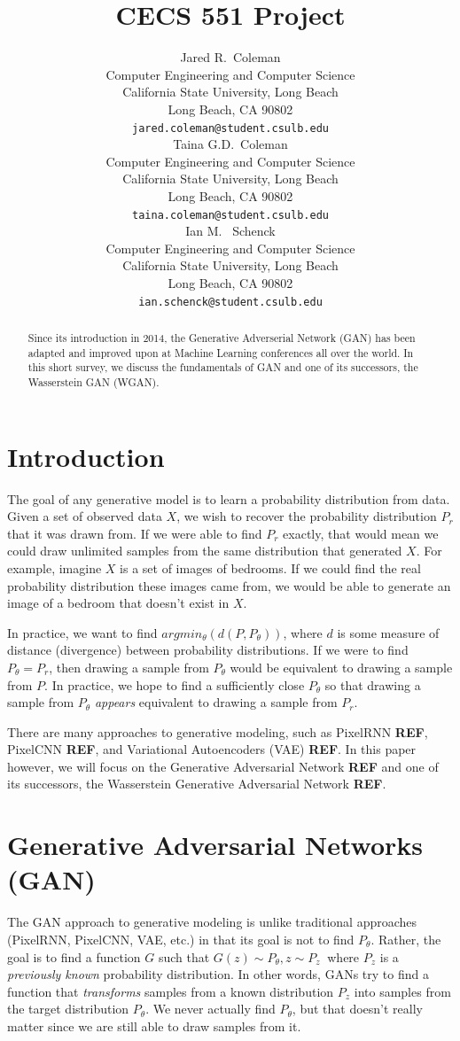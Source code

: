 \documentclass{article}
\title{CECS 551 Project}
\author{%
  Jared R.~Coleman\\
  Computer Engineering and Computer Science\\
  California State University, Long Beach\\
  Long Beach, CA 90802 \\
  \texttt{jared.coleman@student.csulb.edu} \\
  \And 
  Taina G.D.~Coleman\\
  Computer Engineering and Computer Science\\
  California State University, Long Beach\\
  Long Beach, CA 90802 \\
  \texttt{taina.coleman@student.csulb.edu} \\
  \And 
  Ian M. ~Schenck\\
  Computer Engineering and Computer Science\\
  California State University, Long Beach\\
  Long Beach, CA 90802 \\
  \texttt{ian.schenck@student.csulb.edu} \\
}
\begin{document}
\maketitle

\begin{abstract}
   Since its introduction in 2014, the Generative Adverserial Network (GAN) has been adapted and improved upon at Machine Learning conferences all over the world. In this short survey, we discuss the fundamentals of GAN and one of its successors, the Wasserstein GAN (WGAN).
\end{abstract}


\section{Introduction} 
The goal of any generative model is to learn a probability distribution from data. Given a set of observed data $X$, we wish to recover the probability distribution $P_r$ that it was drawn from. If we were able to find $P_r$ exactly, that would mean we could draw unlimited samples from the same distribution that generated $X$. For example, imagine $X$ is a set of images of bedrooms. If we could find the real probability distribution these images came from, we would be able to generate an image of a bedroom that doesn't exist in $X$. 


In practice, we want to find $argmin_\theta(d(P, P_\theta))$, where $d$ is some measure of distance (divergence) between probability distributions. If we were to find $P_\theta=P_r$, then drawing a sample from $P_\theta$ would be equivalent to drawing a sample from $P$. In practice, we hope to find a sufficiently close $P_\theta$ so that drawing a sample from $P_\theta$ \textit{appears} equivalent to drawing a sample from $P_r$.

There are many approaches to generative modeling, such as PixelRNN \textbf{REF}, PixelCNN \textbf{REF}, and Variational Autoencoders (VAE) \textbf{REF}. In this paper however, we will focus on the Generative Adversarial Network \textbf{REF} and one of its successors, the Wasserstein Generative Adversarial Network \textbf{REF}.

\section{Generative Adversarial Networks (GAN)}

The GAN approach to generative modeling is unlike traditional approaches (PixelRNN, PixelCNN, VAE, etc.) in that its goal is not to find $P_\theta$. Rather, the goal is to find a function $G$ such that $G(z) \sim P_\theta, z \sim P_z~$ where $P_z$ is a \textit{previously known} probability distribution. In other words, GANs try to find a function that \textit{transforms} samples from a known distribution $P_z$ into samples from the target distribution $P_\theta$. We never actually find $P_\theta$, but that doesn't really matter since we are still able to draw samples from it. 
\end{document}
